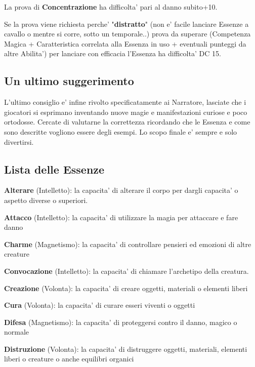 \documentclass[a4paper,11pt,twoside,openany]{book}
\begin{document}
La prova di \textbf{Concentrazione} ha difficolta' pari al danno subito+10.

Se la prova viene richiesta perche' "\textbf{distratto}" (non e' facile lanciare Essenze a cavallo o mentre si corre, sotto un temporale..) prova da superare (Competenza Magica + Caratteristica correlata alla Essenza in uso + eventuali punteggi da altre Abilita') per lanciare con efficacia l'Essenza ha difficolta' DC 15.

\subsection{Un ultimo suggerimento}

L'ultimo consiglio e' infine rivolto specificatamente ai Narratore, lasciate che i giocatori si esprimano inventando nuove magie e manifestazioni curiose e poco ortodosse. Cercate di valutarne la correttezza ricordando che le Essenza e come sono descritte vogliono essere degli esempi. Lo scopo finale e' sempre e solo divertirsi.

\subsection{Lista delle Essenze}

\textbf{Alterare} (Intelletto): la capacita' di alterare il corpo per dargli capacita' o aspetto diverse o superiori.

\textbf{Attacco} (Intelletto): la capacita' di utilizzare la magia per attaccare e fare danno

 \textbf{Charme} (Magnetismo): la capacita' di controllare pensieri
ed emozioni di altre creature

\textbf{Convocazione} (Intelletto): la capacita' di chiamare l'archetipo
della creatura.

\textbf{Creazione} (Volonta): la capacita' di creare oggetti, materiali o elementi liberi

\textbf{Cura} (Volonta): la capacita' di curare esseri viventi o oggetti

\textbf{Difesa} (Magnetismo): la capacita' di proteggersi contro il danno, magico o normale

\textbf{Distruzione} (Volonta): la capacita' di distruggere oggetti, materiali, elementi liberi o creature o anche equilibri organici
\end{document}
